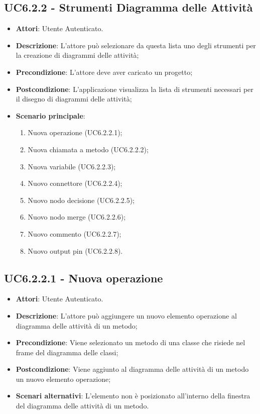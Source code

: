 \subsection{UC6.2.2 - Strumenti Diagramma delle Attività} 
\label{ssec:UC6.2.2} 
\begin{itemize} 
\item \textbf{Attori}: Utente Autenticato.
\item \textbf{Descrizione}: L'attore può selezionare da questa lista uno degli strumenti per la creazione di diagrammi delle attività;
\item \textbf{Precondizione}: L'attore deve aver caricato un progetto;
\item \textbf{Postcondizione}: L'applicazione visualizza la lista di strumenti necessari per il disegno di diagrammi delle attività;
\item \textbf{Scenario principale}: \begin{enumerate}\item Nuova operazione (UC6.2.2.1);\item Nuova chiamata a metodo (UC6.2.2.2);\item Nuova variabile (UC6.2.2.3);\item Nuovo connettore (UC6.2.2.4);\item Nuovo nodo decisione (UC6.2.2.5);\item Nuovo nodo merge (UC6.2.2.6);\item Nuovo commento (UC6.2.2.7);\item Nuovo output pin (UC6.2.2.8). 
 \end{enumerate}
\end{itemize} 
\subsection{UC6.2.2.1 - Nuova operazione} 
\label{ssec:UC6.2.2.1} 
\begin{itemize} 
\item \textbf{Attori}: Utente Autenticato.
\item \textbf{Descrizione}: L'attore può aggiungere un nuovo elemento operazione al diagramma delle attività di un metodo;
\item \textbf{Precondizione}: Viene selezionato un metodo di una classe che risiede nel frame del diagramma delle  classi;
\item \textbf{Postcondizione}: Viene aggiunto al diagramma delle attività di un metodo un nuovo elemento operazione;
\item \textbf{Scenari alternativi}: L'elemento non è posizionato all'interno della finestra del diagramma delle attività di un metodo.
\end{itemize} 
